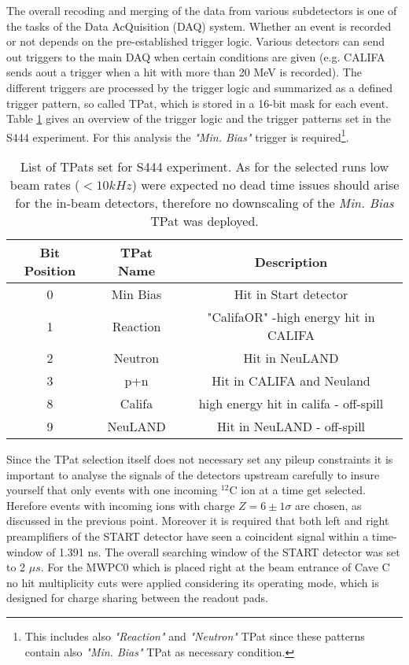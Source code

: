 \begin{enumerate}
The overall recoding and merging of the data from various subdetectors is one of the tasks of the Data AcQuisition (DAQ) system. Whether an event is recorded or not depends on the pre-established trigger logic. Various detectors can send out triggers to the main DAQ when certain conditions are given (e.g. CALIFA sends aout a trigger when a hit with more than 20 MeV is recorded). The different triggers are processed by the trigger logic and summarized as a defined trigger pattern, so called TPat, which is stored in a 16-bit mask for each event. Table \ref{tab:tpats} gives an overview of the trigger logic and the trigger patterns set in the S444 experiment. For this analysis the \textit{"Min. Bias"} trigger is required\footnote{This includes also \textit{"Reaction"} and \textit{"Neutron"} TPat since these patterns contain also \textit{"Min. Bias"} TPat as necessary condition.}.\newline 
\begin{table}[h!]
\centering
\begin{tabular}{||c c c||} 
\hline
Bit Position &TPat Name & Description \\
\hline\hline
0 & Min Bias & Hit in Start detector\\
1 & Reaction & "CalifaOR" -high energy hit in CALIFA \\
2 & Neutron & Hit in NeuLAND \\
3 & p+n & Hit in CALIFA and Neuland \\
8 & Califa & high energy hit in califa - off-spill \\
9 & NeuLAND & Hit in NeuLAND - off-spill \\
\hline\hline
\end{tabular}
\caption{List of TPats set for S444 experiment. As for the selected runs low beam rates ($< 10kHz$) were expected no dead time issues should arise for the in-beam detectors, therefore no downscaling of the \textit{Min. Bias} TPat was deployed.}
\label{tab:tpats}
\end{table}
Since the TPat selection itself does not necessary set any pileup constraints it is important to analyse the signals of the detectors upstream carefully to insure yourself that only events with  one incoming $^{12}$C ion at a time get selected. Herefore events with incoming ions with charge $Z = 6 \pm 1\sigma$ are chosen, as discussed in the previous point. Moreover it is required that both left and right preamplifiers of the START detector have seen a coincident signal within a time-window of 1.391 ns. The overall searching window of the START detector was set to 2 $\mu s$. For the MWPC0 which is placed right at the beam entrance of Cave C no hit multiplicity cuts were applied considering its operating mode, which is designed for charge sharing between the readout pads. 

\end{enumerate}
